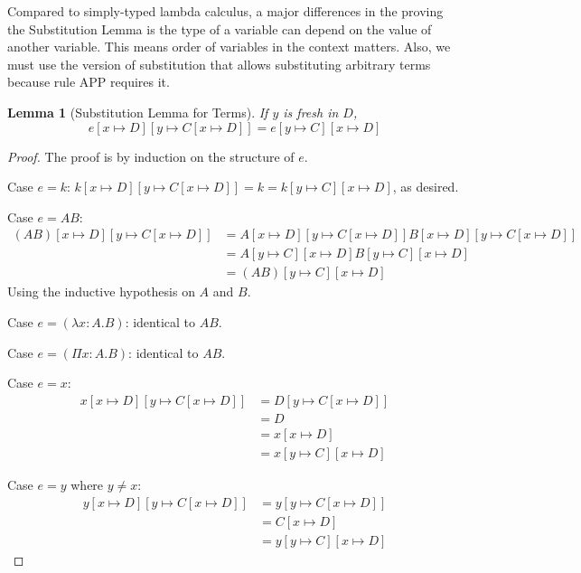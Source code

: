 \documentclass{article}
\newtheorem{lemma}{Lemma}
\begin{document}
Compared to simply-typed lambda calculus, a major differences in the proving the Substitution Lemma is the type of a variable can depend on the value of another variable. This means order of variables in the context matters. Also, we must use the version of substitution that allows substituting arbitrary terms because rule APP requires it.

\begin{lemma}[Substitution Lemma for Terms]
  If $y$ is fresh in $D$,
  \[e[x\mapsto D][y\mapsto C[x\mapsto D]]=e[y\mapsto C][x\mapsto D]\]
\end{lemma}
\begin{proof}
  The proof is by induction on the structure of $e$.
  
  Case $e=k$: $k[x\mapsto D][y\mapsto C[x\mapsto D]]=k=k[y\mapsto C][x\mapsto D]$, as desired.

  Case $e=A B$:
  \begin{align*}
    (A B)[x\mapsto D][y\mapsto C[x\mapsto D]]&=A[x\mapsto D][y\mapsto C[x\mapsto D]]B[x\mapsto D][y\mapsto C[x\mapsto D]]\\
    &=A[y\mapsto C][x\mapsto D]B[y\mapsto C][x\mapsto D]\\
    &=(A B)[y\mapsto C][x\mapsto D]
  \end{align*}
  Using the inductive hypothesis on $A$ and $B$.
  
  Case $e=(\lambda x:A.B)$: identical to $A B$.
  
  Case $e=(\Pi x:A.B)$: identical to $A B$.

  Case $e=x$:
  \begin{align*}
    x[x\mapsto D][y\mapsto C[x\mapsto D]]&=D[y\mapsto C[x\mapsto D]]\\
    &=D\\
    &=x[x\mapsto D]\\
    &=x[y\mapsto C][x\mapsto D]
  \end{align*}
  
  Case $e=y$ where $y\ne x$:
  \begin{align*}
    y[x\mapsto D][y\mapsto C[x\mapsto D]]&=y[y\mapsto C[x\mapsto D]]\\
    &=C[x\mapsto D]\\
    &=y[y\mapsto C][x\mapsto D]
  \end{align*}
  
\end{proof}
\end{document}
